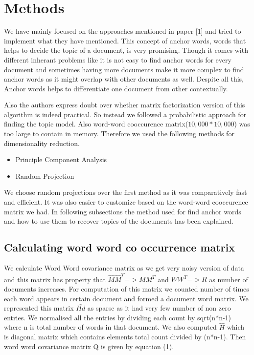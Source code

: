 \documentclass[a4paper,11pt]{article}
\begin{document}
\section{Methods}
We have mainly focused on the approaches mentioned in paper [1] and tried to implement what they have mentioned. This concept of anchor words, words that helps to decide the topic of a document, is very promising. Though it comes with different inherant problems like it is not easy to find anchor words for every document and sometimes having more documents make it more complex to find anchor words as it might overlap with other documents as well. Despite all this, Anchor words helps to differentiate one document from other contextually. 

Also the authors express doubt over whether matrix factorization version of this algorithm is indeed practical. So instead we followed a probabilistic approach for finding the topic model. Also word-word cooccurence matrix($10,000*10,000$) was too large to contain in memory. Therefore we used the following methods for dimensionality reduction.

\begin{itemize}
\item Principle Component Analysis
\item Random Projection 
\end{itemize} 

We choose random projections over the first method as it was comparatively fast and efficient. It was also easier to customize based on the word-word cooccurence matrix we had. In following subsections the method used for find anchor words and how to use them to recover topics of the documents has been explained. \\

\subsection{Calculating word word co occurrence matrix}
We calculate Word Word covariance matrix as we get very noisy version of data and this matrix has property that  $\hat{M} \hat{M}^T -> M M^T $ and $W W^T -> R$ as number of documents increases. For computation of this matrix we counted number of times each word appears in certain document and formed a document word matrix. We represented this matrix $\bar{Hd}$ as sparse as it had very few number of non zero entries. We normalised all the entries by dividing each count by sqrt(n*n-1) where n is total number of words in that document. We also computed $\hat{H}$ which is diagonal matrix which contains elements total count divided by (n*n-1). Then word word covariance matrix Q is given by equation (1).
\end{document}
